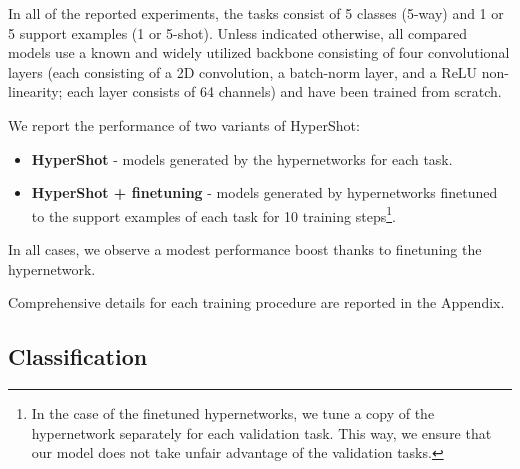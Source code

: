 \documentclass[nohyperref]{article}
\def\our{HyperShot}
\theoremstyle{plain}
\theoremstyle{definition}
\theoremstyle{remark}
\begin{document}
In all of the reported experiments, the tasks consist of 5 classes (5-way) and 1 or 5 support examples (1 or 5-shot). Unless indicated otherwise, all compared models use a known and widely utilized backbone consisting of four convolutional layers (each consisting of a 2D convolution, a batch-norm layer, and a ReLU non-linearity; each layer consists of 64 channels) and have been trained from scratch.

We report the performance of two variants of \our{}:
\begin{itemize}
    \item \textbf{\our{}} - models generated by the hypernetworks for each task.
    
    \item \textbf{\our{} + finetuning} - models generated by hypernetworks finetuned to the support examples of each task for 10 training steps\footnote{In the case of the finetuned hypernetworks, we tune a copy of the hypernetwork separately for each validation task. This way, we ensure that our model does not take unfair advantage of the validation tasks.}. 
\end{itemize}

In all cases, we observe a modest performance boost thanks to finetuning the hypernetwork.

Comprehensive details for each training procedure are reported in the Appendix.

\subsection{Classification}\label{sec:classification}
\end{document}
